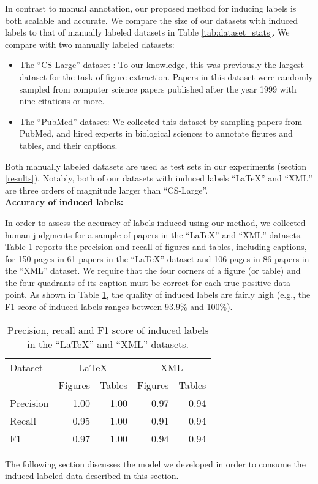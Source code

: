 \documentclass[sigconf]{acmart}
\begin{document}
In contrast to manual annotation, our proposed method for inducing labels is both scalable and accurate.
We compare the size of our datasets with induced labels to that of manually labeled datasets in Table \ref{tab:dataset_stats}.
We compare with two manually labeled datasets:
\begin{itemize}
\item The ``CS-Large'' dataset \cite{pdffigures2}: To our knowledge, this was previously the largest dataset for the task of figure extraction. Papers in this dataset were randomly sampled from computer science papers published after the year 1999 with nine citations or more.
\item The ``PubMed'' dataset: We collected this dataset by sampling papers from PubMed, and hired experts in biological sciences to annotate figures and tables, and their captions. 
\end{itemize}
Both manually labeled datasets are used as test sets in our experiments (section \ref{results}).
Notably, both of our datasets with induced labels ``LaTeX'' and ``XML'' are three orders of magnitude larger than ``CS-Large''.
\\[15pt]\textbf{Accuracy of induced labels:}

In order to assess the accuracy of labels induced using our method, we collected human judgments for a sample of papers in the ``LaTeX'' and ``XML'' datasets.
Table \ref{tab:dataset_eval} reports the precision and recall of figures and tables, including captions, for 150 pages in 61 papers in the ``LaTeX'' dataset and 106 pages in 86 papers in the ``XML'' dataset.
We require that the four corners of a figure (or table) and the four quadrants of its caption must be correct for each true positive data point.
As shown in Table \ref{tab:dataset_eval}, the quality of induced labels are fairly high (e.g., the F1 score of induced labels ranges between 93.9\% and 100\%).

\begin{table}
\begin{center}
\begin{tabular}{|l|rr|rr|} \hline
Dataset        & \multicolumn{2}{c|}{LaTeX} & \multicolumn{2}{c|}{XML} \\
               & Figures & Tables & Figures & Tables \\ \hline 
Precision      & 1.00    & 1.00   & 0.97    & 0.94   \\ 
Recall         & 0.95    & 1.00   & 0.91    & 0.94   \\ 
F1             & 0.97    & 1.00   & 0.94    & 0.94   \\ \hline
\end{tabular}
\vspace{0.2cm}
\caption{Precision, recall and F1 score of induced labels in the ``LaTeX'' and ``XML'' datasets. }\label{tab:dataset_eval}
\end{center}
\end{table}The following section discusses the model we developed in order to consume the induced labeled data described in this section.
\end{document}
